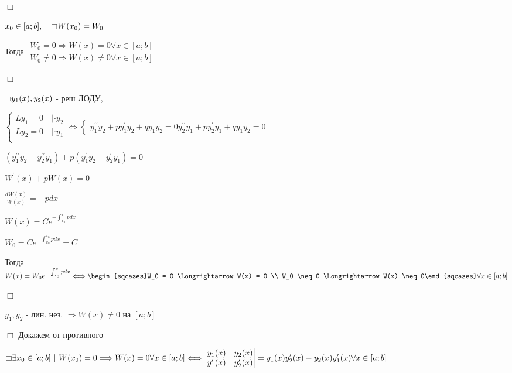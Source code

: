 \documentclass[12pt]{article}
\begin{document}
    $\Box$

     $\displaystyle x_0 \in [a;b], \quad \mathord{\sqsupset} W(x_0) = W_0$

    Тогда $\displaystyle \begin{matrix}W_0 = 0 \Longrightarrow W(x) = 0 \forall x \in [a;b] \\
    W_0 \neq 0 \Longrightarrow W(x) \neq 0 \forall x \in [a;b]\end{matrix}$

    $\Box$

    $\displaystyle \mathord{\sqsupset} y_1(x), y_2(x)$ - реш ЛОДУ,

    $\displaystyle \begin{cases}
        Ly_1 = 0 \quad | \cdot y_2 \\
        Ly_2 = 0 \quad | \cdot y_1 \\
    \end{cases} \Longleftrightarrow
    \begin{cases}
        y_1^{\prime\prime} y_2 + py_1^{\prime} y_2 + q y_1 y_2 = 0
        y_2^{\prime\prime} y_1 + py_2^{\prime} y_1 + q y_1 y_2 = 0
    \end{cases}$

    $\displaystyle (y_1^{\prime\prime} y_2 - y_2^{\prime\prime} y_1) + p (y_1^{\prime} y_2 - y_2^{\prime} y_1) = 0$

    $\displaystyle W^\prime(x) + pW(x) = 0$

    $\displaystyle \frac{dW(x)}{W(x)} = -pdx$

    $\displaystyle W(x) = Ce^{-\int_{x_0}^x pdx}$

    $\displaystyle W_0 = Ce^{-\int^{x_0}_{x_0} pdx} = C$

    Тогда $\displaystyle W(x) = W_0 e^{-\int_{x_0}^x pdx} \Longleftrightarrow \begin{sqcases}W_0 = 0 \Longrightarrow W(x) = 0 \\ W_0 \neq 0 \Longrightarrow W(x) \neq 0\end{sqcases} \forall x \in [a;b]$

    $\Box$

     $\displaystyle y_1, y_2$ - лин. нез. $\Longrightarrow W(x) \neq 0$ на $[a;b]$

    $\Box$ Докажем от противного

    $\displaystyle \mathord{\sqsupset} \exists x_0 \in [a;b] \ | \ W(x_0)= 0 \Longrightarrow W(x) = 0 \forall x \in [a;b] \Longleftrightarrow
    \begin{vmatrix}y_1(x) & y_2(x) \\ y_1^\prime(x) & y_2^\prime(x)\end{vmatrix} = y_1(x) y_2^\prime(x) - y_2(x) y_1^\prime(x) \forall x \in [a;b]$
\end{document}
